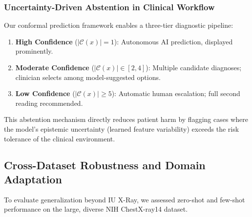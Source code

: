 \documentclass[10pt,a4paper,twocolumn]{article}
\begin{document}
\subsubsection{Uncertainty-Driven Abstention in Clinical Workflow}
Our conformal prediction framework enables a three-tier diagnostic pipeline:
\begin{enumerate}
    \item \textbf{High Confidence} ($|\mathcal{C}(x)| = 1$): Autonomous AI prediction, displayed prominently.
    \item \textbf{Moderate Confidence} ($|\mathcal{C}(x)| \in [2,4]$): Multiple candidate diagnoses; clinician selects among model-suggested options.
    \item \textbf{Low Confidence} ($|\mathcal{C}(x)| \geq 5$): Automatic human escalation; full second reading recommended.
\end{enumerate}
This abstention mechanism directly reduces patient harm by flagging cases where the model's epistemic uncertainty (learned feature variability) exceeds the risk tolerance of the clinical environment.

\subsection{Cross-Dataset Robustness and Domain Adaptation}
To evaluate generalization beyond IU X-Ray, we assessed zero-shot and few-shot performance on the large, diverse NIH ChestX-ray14 dataset.

\begin{table}[h]
\centering
\caption{Zero-Shot \& Few-Shot Classification on NIH ChestX-ray14 (n=28,876 test images, 14 pathology classes)}
\label{tab:cross_dataset}
\end{table}
\end{document}
